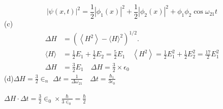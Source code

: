 \begin{enumerate}
\begin{answer}
	$$
	|\psi(x, t)|^{2}=\frac{1}{2}\left|\phi_{1}(x)\right|^{2}+\frac{1}{2}\left|\phi_{2}(x)\right|^{2}+\phi_{1} \phi_{2} \cos \omega_{21} t
	$$
	(c)\begin{align*}
		\Delta H &=\left(\left\langle H^{2}\right\rangle-\langle H\rangle^{2}\right)^{1 / 2} . \\
		\langle H\rangle &=\frac{1}{2} E_{1}+\frac{1}{2} E_{2}=\frac{5}{2} E_{1} \quad\left\langle H^{2}\right\rangle=\frac{1}{2} E_{1}^{2}+\frac{1}{2} E_{2}^{2}=\frac{17}{2} E_{1}^{2} \\
		\Delta H &=\frac{3}{2} E_{1} \quad \Delta H=\frac{3}{2} \times \epsilon_{0}
	\end{align*}
	(d)$\Delta H=\frac{3}{2} \in_{n}$
	$\Delta t=\frac{1}{\Delta \omega_{21}} \quad \Delta t=\frac{\hbar_{1}}{3 \epsilon_{0}}$\\\\
	$
	\Delta H \cdot \Delta t=\frac{3}{2} \in_{0} \times \frac{\hbar}{3 \in_{0}}=\frac{\hbar}{2}
	$
\end{answer}
\end{enumerate}